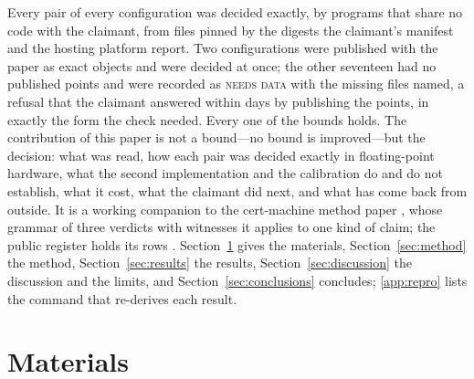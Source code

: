 \documentclass[preprint,11pt,authoryear,a4paper]{elsarticle}
\newcommand{\vword}[1]{{\normalfont\scshape #1}}
\newcommand{\vN}{\vword{needs data}}
\begin{document}
Every pair of every configuration was decided exactly, by programs that share no code with the claimant, from files pinned by the digests the claimant's manifest and the hosting platform report. Two configurations were published with the paper as exact objects and were decided at once; the other seventeen had no published points and were recorded as \vN{} with the missing files named, a refusal that the claimant answered within days by publishing the points, in exactly the form the check needed. Every one of the \MtKwRows{} bounds holds. The contribution of this paper is not a bound---no bound is improved---but the decision: what was read, how each pair was decided exactly in floating-point hardware, what the second implementation and the calibration do and do not establish, what it cost, what the claimant did next, and what has come back from outside. It is a working companion to the cert-machine method paper \citep[the method paper]{CMArchive}, whose grammar of three verdicts with witnesses it applies to one kind of claim; the public register holds its rows \citep{Register}. Section~\ref{sec:materials} gives the materials, Section~\ref{sec:method} the method, Section~\ref{sec:results} the results, Section~\ref{sec:discussion} the discussion and the limits, and Section~\ref{sec:conclusions} concludes; \ref{app:repro} lists the command that re-derives each result.

\section{Materials}\label{sec:materials}
\end{document}
